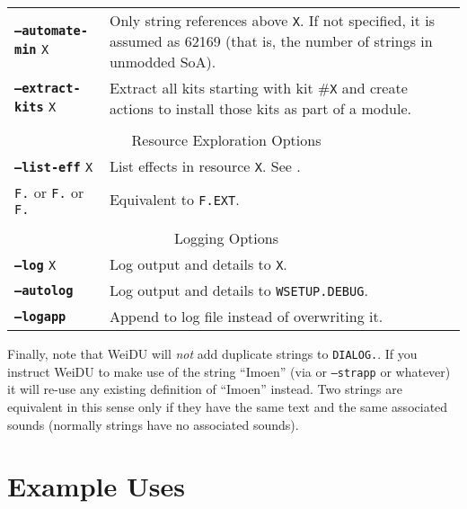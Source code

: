 \documentclass{article}
\def\ttref#1{\ahrefloc{#1}{\tt #1}}
\def\DEFINE#1{{\tt \bf #1}\label{#1}\index{#1}}
\def\t#1{{\tt #1}}
\begin{document}
\begin{tabular}{lp{10in}|p{10in}}
\DEFINE{--automate-min} \t{X}& Only \ttref{--automate} string references above \t{X}. If not specified, it is assumed as 62169 (that is, the number of strings in unmodded SoA). \\
\DEFINE{--extract-kits} \t{X} & Extract all kits starting with kit \#\t{X}
and create \ttref{TP2} actions to install those kits as part of a module.  \\
\\
\multicolumn{2}{c}{ \color{red} Resource Exploration Options } \\
\DEFINE{--list-eff} \t{X}&	List effects in resource \t{X}. See
\ttref{--out}. \\
{\tt F.}\ttref{ITM} or
{\tt F.}\ttref{EFF} or
\tt{F.}\ttref{SPL} & Equivalent to \ttref{--list-eff} \t{F.EXT}. \\
\\
\multicolumn{2}{c}{ \color{red} Logging Options } \\
\DEFINE{--log} \t{X}&	Log output and details to \t{X}. \\
\DEFINE{--autolog} & 	Log output and details to \t{WSETUP.DEBUG}. \\
\DEFINE{--logapp} & 	Append to log file instead of overwriting it. \\
\end{tabular}

Finally, note that WeiDU will \emph{not} add duplicate strings to
\t{DIALOG.}\ttref{TLK}. If you instruct WeiDU to make use of the string
``Imoen'' (via \ttref{SAY} or \t{--strapp} or whatever) it will re-use any
existing definition of ``Imoen'' instead. Two strings are equivalent in
this sense only if they have the same text and the same associated sounds
(normally strings have no associated sounds).

\section{Example Uses}
\end{document}
